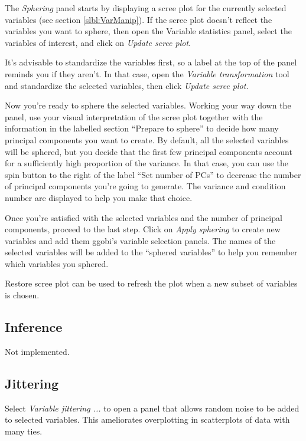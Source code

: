 \documentclass[11pt]{article}
\begin{document}
The {\em Sphering} panel starts by displaying a scree plot for the
currently selected variables (see section \ref{slbl:VarManip}).  If the
scree plot doesn't reflect the variables you want to sphere, then open
the Variable statistics panel, select the variables of interest, and
click on {\em Update scree plot}.

It's advisable to standardize the variables first, so a label at the top
of the panel reminds you if they aren't.  In that case, open the {\em
Variable transformation} tool and standardize the selected variables,
then click {\em Update scree plot.}

Now you're ready to sphere the selected variables.  Working your way down
the panel, use your visual interpretation of the scree plot together
with the information in the labelled section ``Prepare to sphere'' to
decide how many principal components you want to create.  By default,
all the selected variables will be sphered, but you decide that the first
few principal components account for a sufficiently high proportion of
the variance.  In that case, you can use the spin button to the right
of the label ``Set number of PCs'' to decrease the number of principal
components you're going to generate.  The variance and condition number
are displayed to help you make that choice.

Once you're satisfied with the selected variables and the number of
principal components, proceed to the last step.  Click on {\em Apply
sphering} to create new variables and add them ggobi's variable selection
panels.  The names of the selected variables will be added to the
``sphered variables'' to help you remember which variables you sphered.

Restore scree plot can be used to refresh the plot when a new subset
of variables is chosen.

\subsection{Inference}

Not implemented.

\subsection{Jittering}

Select {\em Variable jittering ...} to open a panel that allows
random noise to be added to selected variables.  This ameliorates
overplotting in scatterplots of data with many ties.
\end{document}
